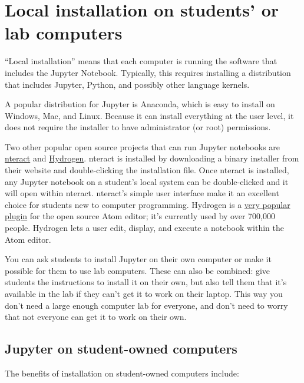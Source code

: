 \documentclass[]{book}
\begin{document}
\section{Local installation on students' or lab
computers}\label{local-installation-on-students-or-lab-computers}

``Local installation'' means that each computer is running the software
that includes the Jupyter Notebook. Typically, this requires installing
a distribution that includes Jupyter, Python, and possibly other
language kernels.

A popular distribution for Jupyter is Anaconda, which is easy to install
on Windows, Mac, and Linux. Because it can install everything at the
user level, it does not require the installer to have administrator (or
root) permissions.

Two other popular open source projects that can run Jupyter notebooks
are \href{https://nteract.io/}{nteract} and
\href{https://nteract.io/atom}{Hydrogen}. nteract is installed by
downloading a binary installer from their website and double-clicking
the installation file. Once nteract is installed, any Jupyter notebook
on a student's local system can be double-clicked and it will open
within nteract. nteract's simple user interface make it an excellent
choice for students new to computer programming. Hydrogen is a
\href{https://atom.io/packages/hydrogen}{very popular plugin} for the
open source Atom editor; it's currently used by over 700,000 people.
Hydrogen lets a user edit, display, and execute a notebook within the
Atom editor.

You can ask students to install Jupyter on their own computer or make it
possible for them to use lab computers. These can also be combined: give
students the instructions to install it on their own, but also tell them
that it's available in the lab if they can't get it to work on their
laptop. This way you don't need a large enough computer lab for
everyone, and don't need to worry that not everyone can get it to work
on their own.

\subsection{Jupyter on student-owned
computers}\label{jupyter-on-student-owned-computers}

The benefits of installation on student-owned computers include:
\end{document}
